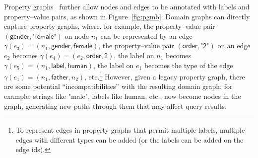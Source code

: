 
Property graphs~\cite{AnglesABHRV17} further allow nodes and edges to be annotated with labels and property--value pairs, as shown in Figure~\ref{fig:pgmb}. Domain graphs can directly capture property graphs, where, for example, the property--value pair $(\textsf{gender},\textsf{"female"})$ on node $n_1$ can be represented by an edge $\gamma(e_3) = (n_1,\textsf{gender},\textsf{female})$, the property--value pair $(\textsf{order},\textsf{"2"})$ on an edge $e_2$ becomes $\gamma(e_4) = (e_2,\textsf{order},\textsf{2})$, the label on $n_1$ becomes $\gamma(e_5) = (n_1,\textsf{label},\textsf{human})$, the label on $e_1$ becomes the type of the edge $\gamma(e_1) = (n_1,\textsf{father},n_2)$, etc.\footnote{To represent edges in property graphs that permit multiple labels, multiple edges with different types can be added (or the labels can be added on the edge ids).} However, given a legacy property graph, there are some potential ``incompatibilities'' with the resulting domain graph; for example, strings like \textsf{"male"}, labels like \textsf{human}, etc., now become nodes in the graph, generating new paths through them that may affect query results.

